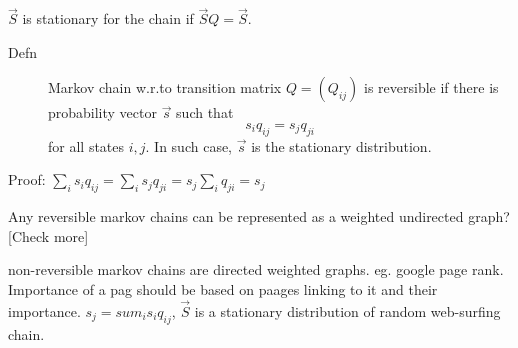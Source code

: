 \begin{slide}
$\vec{S}$  is stationary for the chain if $\vec{S}Q = \vec{S}$.


\end{slide}
\begin{slide}
\begin{description}
  \item[Defn] Markov chain w.r.to transition matrix $Q =(Q_{ij})$ is reversible if there is  probability vector $\vec{s}$ such that 
$$s_iq_{ij} = s_jq_{ji}$$ for all states $i,j$. In such case, $\vec{s}$ is the stationary distribution.
\end{description}
Proof: $\sum_is_iq_{ij} = \sum_is_jq_{ji} = s_j\sum_iq_{ji} = s_j$

Any reversible markov chains can be represented as a weighted undirected graph? [Check more]

non-reversible markov chains are directed weighted graphs. eg. google page rank.
Importance of a pag should be based on paages linking to it and their importance.
$s_j = sum_{i} s_i q_{ij}$, $\vec{S}$ is a stationary distribution of random web-surfing chain.

\end{slide}  
